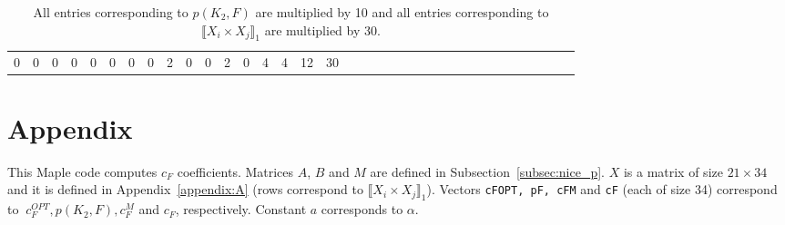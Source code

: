 \documentclass[12pt]{article}
\theoremstyle{definition}
\theoremstyle{remark}
\begin{document}
{\begin{table}[H]
\begin{adjustbox}{angle=90}
{\begin{tabular}{c||c|c|c|c|c|c|c|c|c|c|c|c|c|c|c|c|c|c|c|c|c|c|c|c|c|c|c|c|c|c|c|c|c|c}
0  & %
0  & %
0  & %
0  & %
0  & %
0  & %
0  & %
0  & %
2  & %
0  & %
0  & %
2  & %
0  & %
4  & %
4  & %
12  & %
30   %
\end{tabular}
}
\end{adjustbox}
\caption{All entries corresponding to $p(K_2,F)$ are multiplied by 10 and all entries corresponding to $\llbracket X_i \times X_j \rrbracket_1$ are multiplied by 30.}
\label{table:pF}
\end{table}



\newpage

\section{Appendix}\label{appendix:B}

This Maple code computes $c_F$ coefficients. Matrices $A$, $B$ and $M$ are defined in Subsection~\ref{subsec:nice_p}. $X$ is a matrix of size $21 \times 34$ and it is defined in Appendix~\ref{appendix:A} (rows correspond to $\llbracket X_i \times X_j \rrbracket_1$). Vectors \verb+cFOPT, pF, cFM+ and \verb+cF+ (each of size 34) correspond to $\ c_F^{OPT}, p(K_2,F), c_F^M$ and $c_F$, respectively. Constant $a$ corresponds to $\alpha$.

\bigskip

}
\end{document}
